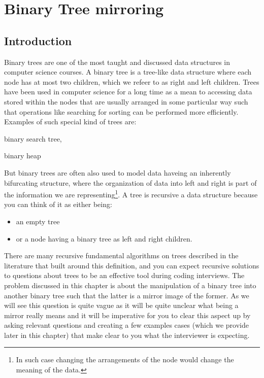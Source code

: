 %

\chapter{Binary Tree mirroring}
\label{ch:mirror_binary_tree}
\section*{Introduction}
Binary trees are one of the most taught and discussed data structures in computer science courses. A
binary tree is a tree-like data structure where each node has at most two children, which we refeer
to as right and left children. Trees have been used in computer science for a long time as a mean to
accessing data stored within the nodes that are usually arranged in some particular way such that
operations like searching for sorting can be performed more efficiently. Examples of such special
kind of trees are: 
\begin{itemize*}
	\item binary search tree,
	\item binary heap
\end{itemize*}

But binary trees are often also used to model data haveing an inherently bifurcating structure, where
the organization of data into left and right is part of the information we are representing\footnote{In such
case changing the arrangements of the node would change the meaning of the data.}.
A tree is recursive a data structure because you can think of it as either being:
\begin{itemize}
	\item an empty tree
	\item or a node having a binary tree as left and right children.
\end{itemize}
There are many recursive fundamental algorithms on trees described in the literature that built around this definition, 
and you can expect recursive solutions to questions about trees to be an effective tool during coding interviews.
The problem discussed in this chapter is about the manipulation of a binary tree into another binary tree
such that the latter is a mirror image of the former. As we will see this question is quite vague as it will be quite unclear what 
being a mirror really means and it will be imperative for you to clear this aspect up by asking relevant questions and 
creating a few examples cases (which we provide later in this chapter) that make clear to you what the interviewer is expecting. 

